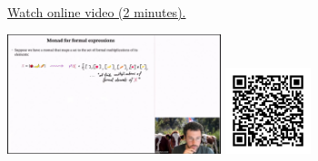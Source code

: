 
\begin{minipage}{10cm}
    \href{https://act4e-spring21.netlify.app/videos/spring2021-monads-b:monad-formal-expr.html}{Watch online video (2 minutes).}
        
    \href{https://act4e-spring21.netlify.app/videos/spring2021-monads-b:monad-formal-expr.html}{\includegraphics[height=3.5cm]{spring2021-monads-b:monad-formal-expr/thumbnails.jpg}}
    \href{https://act4e-spring21.netlify.app/videos/spring2021-monads-b:monad-formal-expr.html}{\includegraphics[height=2.5cm]{spring2021-monads-b:monad-formal-expr/qrcode.png}}
\end{minipage}
